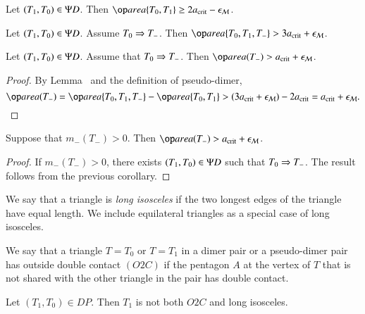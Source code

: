 \begin{lemma}
Let $(T_1,T_0)\in\Psi D$.  Then $\area\{T_0,T_1\} \ge 2\acrit - \epsM$.
\end{lemma}

\begin{lemma}
Let $(T_1,T_0)\in\Psi D$. Assume $T_0\Rightarrow T_-$.  
Then $\area\{T_0,T_1,T_-\} > 3\acrit + \epsM$.
\end{lemma}

\begin{corollary} 
Let $(T_1,T_0)\in\Psi D$.  Assume that $T_0\Rightarrow T_-$.  Then
$\area(T_-) > \acrit+\epsM$.
\end{corollary}

\begin{proof}  
  By Lemma~ and the definition of pseudo-dimer,
\[
\area(T_-) = \area\{T_0,T_1,T_-\} - \area\{T_0,T_1\} 
> (3\acrit + \epsM) - 2\acrit = \acrit + \epsM.
\]
\end{proof}

\begin{corollary}
  Suppose that $m_-(T_-)>0$.  Then $\area(T_-) > \acrit + \epsM$.
\end{corollary}

\begin{proof} 
  If $m_-(T_-)>0$, there exists $(T_1,T_0)\in\Psi D$ such that $T_0\Rightarrow
  T_-$.  The result follows from the previous corollary.
\end{proof}


\begin{definition}
  We say that a triangle is {\it long isosceles} if the two longest edges of
  the triangle have equal length.  We include equilateral triangles as
  a special case of long isosceles.
\end{definition}

\begin{definition}[O2C]
  We say that a triangle $T=T_0$ or $T=T_1$ in a dimer pair or a
  pseudo-dimer pair has outside double contact $(O2C)$ if the pentagon
  $A$ at the vertex of $T$ that is not shared with the other triangle in the
  pair has double contact.
\end{definition}

\begin{lemma}
  Let $(T_1,T_0)\in DP$.  Then $T_1$ is not both $O2C$ and long
  isosceles.
\end{lemma}

